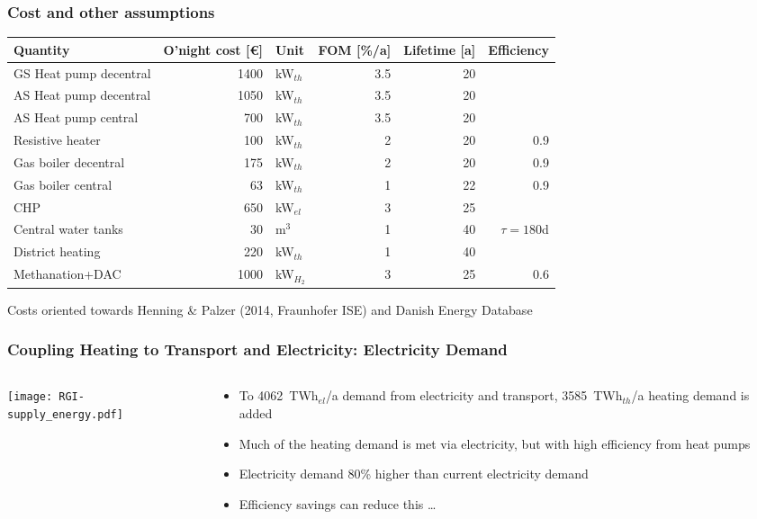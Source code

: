 \documentclass[10pt,aspectratio=169,dvipsnames]{beamer}
\def\el{${}_{el}$}
\def\th{${}_{th}$}
\let\olditem\item
\renewcommand{\item}{%
\olditem\vspace{5pt}}
\begin{document}
\begin{frame}
  \frametitle{Cost and other assumptions}

  \begin{table}
\centering
\begin{tabular}{@{}lrlrrr@{}}
\toprule
Quantity                & O'night cost [\euro]  &Unit & FOM [\%/a] & Lifetime [a] & Efficiency \\
\midrule
GS Heat pump decentral & 1400 & kW\th  & 3.5& 20 \\
AS Heat pump decentral & 1050 & kW\th  & 3.5& 20 \\
AS Heat pump central & 700 & kW\th  & 3.5& 20 \\
Resistive heater & 100  & kW\th  & 2& 20 & 0.9\\
Gas boiler decentral & 175  & kW\th  & 2& 20 & 0.9 \\
Gas boiler central & 63  & kW\th  & 1& 22 & 0.9 \\
CHP & 650 & kW\el & 3& 25\\
Central water tanks & 30 & m${}^3$  & 1& 40 & $\tau = 180$d\\
District heating & 220 & kW\th & 1 & 40 &  \\
Methanation+DAC & 1000 & kW$_{H_2}$ & 3 & 25  & 0.6\\
\bottomrule
\end{tabular}
\end{table}
  Costs oriented towards Henning \& Palzer (2014, Fraunhofer ISE) and Danish Energy Database
\end{frame}


\begin{frame}
  \frametitle{Coupling Heating to Transport and Electricity: Electricity Demand}
  \begin{columns}[T]
    \begin{column}{9cm}
      \texttt{[image: RGI-supply\_energy.pdf]}

    \end{column}
    \begin{column}{5cm}
      \begin{itemize}
      \item To 4062~TWh\el/a demand from electricity and transport, 3585~TWh\th/a heating demand is added
      \item Much of the heating demand is met via electricity, but with high efficiency from heat pumps
      \item Electricity demand 80\% higher than current electricity demand
      \item Efficiency savings can reduce this \dots
      \end{itemize}
    \end{column}
  \end{columns}
\end{frame}
\end{document}
